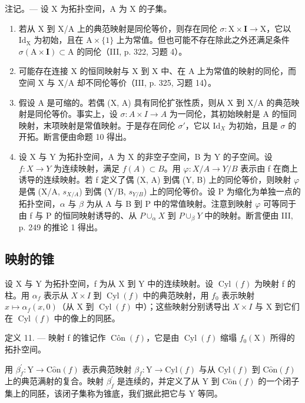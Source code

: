 注记。--- 设 X 为拓扑空间，A 为 X 的子集。

\begin{enumerate}
\def\labelenumi{\arabic{enumi})}
\item
  若从 X 到 X/A 上的典范映射是同伦等价，则存在同伦 \(\sigma\colon\mathrm{X}\times\mathbf{I}\to\mathrm{X}\)，它以 \(\mathrm{Id}_{\mathrm{X}}\) 为初始，且在 \(\mathrm{A}\times\{1\}\) 上为常值。但也可能不存在除此之外还满足条件 \(\sigma(\mathrm{A}\times\mathbf{I})\subset\mathrm{A}\) 的同伦（III, p. 322, 习题 4）。
\item
  可能存在连接 X 的恒同映射与 X 到 X 中、在 A 上为常值的映射的同伦，而空间 X 与 X/A 却不同伦等价（III, p. 325, 习题 14）。
\item
  假设 A 是可缩的。若偶 (X, A) 具有同伦扩张性质，则从 X 到 X/A 的典范映射是同伦等价。事实上，设 \(\sigma\colon A \times I \to A\) 为一同伦，其初始映射是 A 的恒同映射，末项映射是常值映射。于是存在同伦 \(\sigma'\)，它以 \(\mathrm{Id}_{X}\) 为初始，且是 \(\sigma\) 的开拓。断言便由命题 10 得出。
\item
  设 X 与 Y 为拓扑空间，A 为 X 的非空子空间，B 为 Y 的子空间。设 \(f: X \to Y\) 为连续映射，满足 \(f(A) \subset B\)。用 \(\varphi: X/A \to Y/B\) 表示由 f 在商上诱导的连续映射。若 f 定义了偶 (X, A) 到偶 (Y, B) 上的同伦等价，则映射 \(\varphi\) 是偶 (X/A, \(s_{X/A}\)) 到偶 (Y/B, \(s_{Y/B}\)) 上的同伦等价。设 P 为缩化为单独一点的拓扑空间，\(\alpha\) 与 \(\beta\) 为从 A 与 B 到 P 中的常值映射。注意到映射 \(\varphi\) 可等同于由 f 与 P 的恒同映射诱导的、从 \(P \cup_{\alpha} X\) 到 \(P \cup_{\beta} Y\) 中的映射。断言便由 III, p. 249 的推论 1 得出。
\end{enumerate}

\subsection{映射的锥}

设 X 与 Y 为拓扑空间，f 为从 X 到 Y 中的连续映射。设 \(\operatorname{Cyl}(f)\) 为映射 f 的柱。用 \(\alpha_{f}\) 表示从 \(X \times I\) 到 \(\operatorname{Cyl}(f)\) 中的典范映射，用 \(f_{0}\) 表示映射 \(x \mapsto \alpha_{f}(x,0)\)（从 X 到 \(\operatorname{Cyl}(f)\) 中）；这些映射分别诱导出 \(X \times I\) 与 X 到它们在 \(\operatorname{Cyl}(f)\) 中的像上的同胚。

定义 11. --- 映射 f 的锥记作 \(\operatorname{Côn}(f)\)，它是由 \(\operatorname{Cyl}(f)\) 缩塌 \(f_{0}(\mathrm{X})\) 所得的拓扑空间。

用 \(\beta_{f}^{\prime}\colon\mathrm{Y}\to\mathrm{C}\hat{\mathrm{o}}\mathrm{n}(f)\) 表示典范映射 \(\beta_{f}\colon\mathrm{Y}\to\mathrm{C}\mathrm{y}\mathrm{l}(f)\) 与从 \(\mathrm{C}\mathrm{y}\mathrm{l}(f)\) 到 \(\mathrm{C}\hat{\mathrm{o}}\mathrm{n}(f)\) 上的典范满射的复合。映射 \(\beta_{f}^{\prime}\) 是连续的，并定义了从 Y 到 \(\mathrm{C}\hat{\mathrm{o}}\mathrm{n}(f)\) 的一个闭子集上的同胚，该闭子集称为锥底，我们据此把它与 Y 等同。

